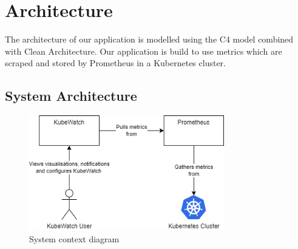\chapter{Architecture}

    

The architecture of our application is modelled using the C4 model combined with Clean Architecture.
Our application is build to use metrics which are scraped and stored by Prometheus in a Kubernetes cluster. 

\section{System Architecture}
\begin{figure}[H]
  \centering
  \includegraphics[height=5cm]{resources/System_context_diagram.png}
  \caption{System context diagram}
  \label{fig:system-context-diagram}
\end{figure}

